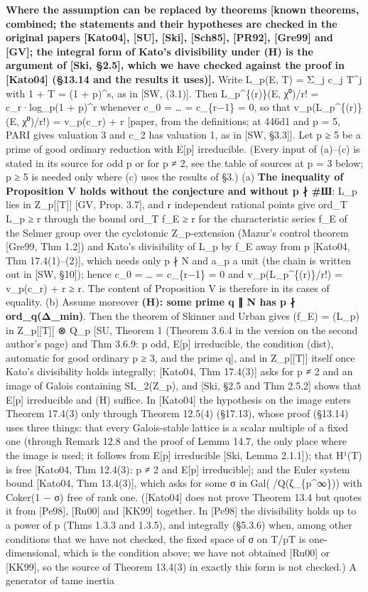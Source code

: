 \documentclass[11pt,a4paper]{article}
\theoremstyle{named}
\begin{document}
\textbf{Where the assumption can be replaced by theorems [known theorems, combined; the statements and their hypotheses are checked in the original papers [Kato04], [SU], [Ski], [Sch85], [PR92], [Gre99] and [GV]; the integral form of Kato's divisibility under (H) is the argument of [Ski, §2.5], which we have checked against the proof in [Kato04] (§13.14 and the results it uses)].} Write L\_p(E, T) = Σ\_j c\_j T\textasciicircum{}j with 1 + T = (1 + p)\textasciicircum{}s, as in [SW, (3.1)]. Then L\_p\textasciicircum{}\{(r)\}(E, χ⁰)/r! = c\_r·log\_p(1 + p)\textasciicircum{}r whenever c\_0 = … = c\_\{r−1\} = 0, so that v\_p(L\_p\textasciicircum{}\{(r)\}(E, χ⁰)/r!) = v\_p(c\_r) + r [paper, from the definitions; at 446d1 and p = 5, PARI gives valuation 3 and c\_2 has valuation 1, as in [SW, §3.3]]. Let p ≥ 5 be a prime of good ordinary reduction with E[p] irreducible. (Every input of (a)–(c) is stated in its source for odd p or for p ≠ 2, see the table of sources at p = 3 below; p ≥ 5 is needed only where (c) uses the results of §3.) (a) \textbf{The inequality of Proposition V holds without the conjecture and without p ∤ \#Ш}: L\_p lies in Z\_p[[T]] [GV, Prop. 3.7], and r independent rational points give ord\_T L\_p ≥ r through the bound ord\_T f\_E ≥ r for the characteristic series f\_E of the Selmer group over the cyclotomic Z\_p-extension (Mazur's control theorem [Gre99, Thm 1.2]) and Kato's divisibility of L\_p by f\_E away from p [Kato04, Thm 17.4(1)–(2)], which needs only p ∤ N and a\_p a unit (the chain is written out in [SW, §10]); hence c\_0 = … = c\_\{r−1\} = 0 and v\_p(L\_p\textasciicircum{}\{(r)\}/r!) = v\_p(c\_r) + r ≥ r. The content of Proposition V is therefore in its cases of equality. (b) Assume moreover \textbf{(H): some prime q ∥ N has p ∤ ord\_q(Δ\_min)}. Then the theorem of Skinner and Urban gives (f\_E) = (L\_p) in Z\_p[[T]] ⊗ Q\_p [SU, Theorem 1 (Theorem 3.6.4 in the version on the second author's page) and Thm 3.6.9: p odd, E[p] irreducible, the condition (dist), automatic for good ordinary p ≥ 3, and the prime q], and in Z\_p[[T]] itself once Kato's divisibility holds integrally; [Kato04, Thm 17.4(3)] asks for p ≠ 2 and an image of Galois containing SL\_2(Z\_p), and [Ski, §2.5 and Thm 2.5.2] shows that E[p] irreducible and (H) suffice. In [Kato04] the hypothesis on the image enters Theorem 17.4(3) only through Theorem 12.5(4) (§17.13), whose proof (§13.14) uses three things: that every Galois-stable lattice is a scalar multiple of a fixed one (through Remark 12.8 and the proof of Lemma 14.7, the only place where the image is used; it follows from E[p] irreducible [Ski, Lemma 2.1.1]); that H¹(T) is free [Kato04, Thm 12.4(3): p ≠ 2 and E[p] irreducible]; and the Euler system bound [Kato04, Thm 13.4(3)], which asks for some σ in Gal(/Q(ζ\_\{p\textasciicircum{}∞\})) with Coker(1 − σ) free of rank one. ([Kato04] does not prove Theorem 13.4 but quotes it from [Pe98], [Ru00] and [KK99] together. In [Pe98] the divisibility holds up to a power of p (Thms 1.3.3 and 1.3.5), and integrally (§5.3.6) when, among other conditions that we have not checked, the fixed space of σ on T/pT is one-dimensional, which is the condition above; we have not obtained [Ru00] or [KK99], so the source of Theorem 13.4(3) in exactly this form is not checked.) A generator of tame inertia 
\end{document}
